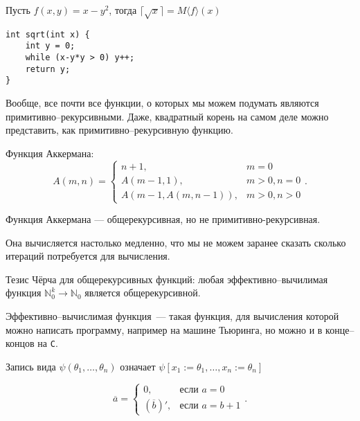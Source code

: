 \begin{example}
Пусть $f(x,y) = x-y^2$, тогда $\lceil\sqrt{x}\rceil = M\langle f\rangle (x)$

\begin{verbatim}
int sqrt(int x) {
    int y = 0;
    while (x-y*y > 0) y++;
    return y;
}
\end{verbatim}
\end{example}

Вообще, все почти все функции, о которых мы можем подумать являются примитивно--ре\-ку\-рсив\-ны\-ми. Даже, квадратный корень на самом деле можно представить, как примитивно--рекурсивную функцию.

\begin{definition}
Функция Аккермана:
\[ A(m,n) = \left\{\begin{array}{ll}
  n+1,&m = 0\\
  A(m-1,1),&m > 0, n = 0\\
  A(m-1,A(m,n-1)),&m > 0, n > 0
\end{array}\right. .\]
\end{definition}

\begin{theorem}
Функция Аккермана --- общерекурсивная, но не примитивно-рекурсивная.

Она вычисляется настолько медленно, что мы не можем заранее сказать сколько итераций потребуется для вычисления.
\end{theorem}

\begin{definition}
Тезис Чёрча для общерекурсивных функций: любая эффективно--вы\-чи\-ли\-мая
функция $\mathbb{N}^k_0\to\mathbb{N}_0$ является общерекурсивной.
\end{definition}

\begin{note}
    Эффективно--вычислимая функция~--- такая функция, для вычисления которой можно написать программу, например на машине Тьюринга, но можно и в конце--концов на \texttt{C}.
\end{note}

\begin{definition}
Запись вида $\psi(\theta_1,\dots,\theta_n)$ означает
$\psi[x_1:=\theta_1,\dots,x_n:=\theta_n]$
\end{definition}

\begin{definition}
\[ \overline{a} = \left\{\begin{array}{ll} 0, &\mbox{если } a = 0\\
 (\overline{b})', &\mbox{если } a = b+1
\end{array}\right. .\]
\end{definition}

